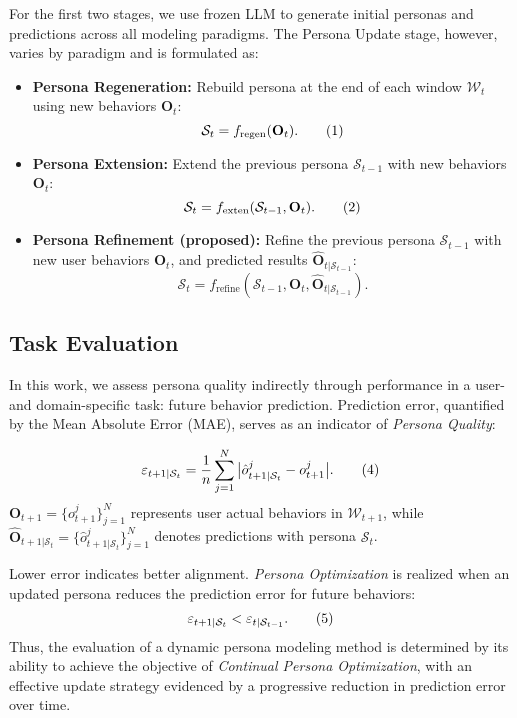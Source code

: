 For the first two stages, we use frozen LLM to generate initial personas and predictions across all modeling paradigms. 
The Persona Update stage, however, varies by paradigm and is formulated as:
\begin{itemize}[noitemsep,left=0pt]
\item \textbf{Persona Regeneration:} Rebuild persona at the end of each window $\mathcal{W}_t$ using new behaviors $\mathbf{O}_t$:
\vspace{-2mm}
\[    
    \mathcal{S}_t = f_{\text{regen}}(\mathbf{O}_t). \tag{1} 
    \vspace{-2mm}
\]
\item \textbf{Persona Extension:} Extend the previous persona $\mathcal{S}_{t-1}$ with new behaviors $\mathbf{O}_t$:  
\vspace{-2mm}
\[
\mathcal{S}_t = f_{\text{exten}}(\mathcal{S}_{t-1}, \mathbf{O}_t). \tag{2} 
    \vspace{-2mm}
\]
\item \textbf{Persona Refinement (proposed):} Refine the previous persona $\mathcal{S}_{t-1}$ with new user behaviors $\mathbf{O}_t$, and predicted results 
$\hat{\mathbf{O}}_{t|\mathcal{S}_{t-1}}$:  
\vspace{-2mm}
\[
\mathcal{S}_t = f_{\text{refine}}(\mathcal{S}_{t-1}, \mathbf{O}_t, \hat{\mathbf{O}}_{t|\mathcal{S}_{t-1}}). \tag{3} 
\]
\end{itemize}
\subsection{Task Evaluation}

In this work, we assess persona quality indirectly through performance in a user- and domain-specific task: future behavior prediction. Prediction error, quantified by the Mean Absolute Error (MAE), serves as an indicator of \textit{Persona Quality}:

\vspace{-2mm}
\[
\varepsilon_{t+1|\mathcal{S}_t} = \frac{1}{n} \sum_{j=1}^N \big| \hat{o}_{t+1|\mathcal{S}_t}^{j} - o_{t+1}^{j} \big|. \tag{4}
\vspace{-2mm}
\]
$\mathbf{O}_{t+1} = \{o_{t+1}^j\}_{j=1}^N$ represents user actual behaviors in $\mathcal{W}_{t+1}$, while $\hat{\mathbf{O}}_{t+1|\mathcal{S}_t} = \{\hat{o}_{t+1|\mathcal{S}_t}^j\}_{j=1}^N$ denotes predictions with persona $\mathcal{S}_t$. 

Lower error indicates better alignment. \textit{Persona Optimization} is realized when an updated persona reduces the prediction error for future behaviors:
\vspace{-2mm}
\[
\varepsilon_{t+1|\mathcal{S}_t} < \varepsilon_{t|\mathcal{S}_{t-1}}. \tag{5}
\vspace{-2mm}
\]
Thus, the evaluation of a dynamic persona modeling method is determined by its ability to achieve the objective of \textit{Continual Persona Optimization}, with an effective update strategy evidenced by a progressive reduction in prediction error over time.